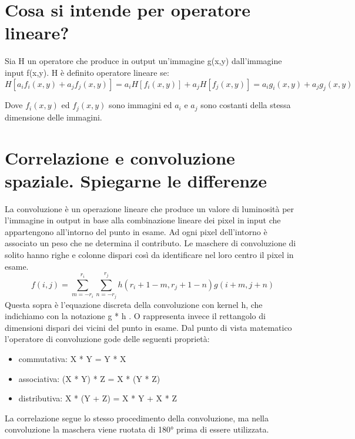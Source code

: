 \section{Cosa si intende per operatore lineare?}
Sia H un operatore che produce in output un'immagine g(x,y) dall'immagine input f(x,y). H è definito operatore lineare se:
$$
H[a_i f_i (x,y) + a_j f_j(x,y)] = a_i H[f_i(x,y)] + a_j H[f_j(x,y)] = a_i g_i(x,y) + a_j g_j(x,y)
$$

Dove $f_i(x,y)$ ed $f_j(x,y)$ sono immagini ed $a_i$ e $a_j$ sono costanti della stessa dimensione delle immagini.

\section{Correlazione e convoluzione spaziale. Spiegarne le differenze}
La convoluzione è un operazione lineare che produce un valore di luminosità per l'immagine in output in base alla combinazione lineare dei pixel in input che appartengono all'intorno del punto in esame. Ad ogni pixel dell'intorno è associato un peso che ne determina il contributo. Le maschere di convoluzione di solito hanno righe e colonne dispari così da identificare nel loro centro il pixel in esame.
$$
f(i,j) = \sum_{m=-r_i}^{r_i} \sum_{n=-r_j}^{r_j} h (r_i+1 -m, r_j+1-n) g(i+m, j+n) 
$$
Questa sopra è l'equazione discreta della convoluzione con kernel h, che indichiamo con la notazione g * h . O rappresenta invece il rettangolo di dimensioni dispari dei vicini del punto in esame. Dal punto di vista matematico l'operatore di convoluzione gode delle seguenti proprietà:
\begin{itemize}
	\item commutativa: X * Y = Y * X
	\item associativa: (X * Y) * Z =  X * (Y * Z)
	\item distributiva: X * (Y + Z) = X * Y + X * Z
\end{itemize}

La correlazione segue lo stesso procedimento della convoluzione, ma nella convoluzione la maschera viene ruotata di 180° prima di essere utilizzata.

